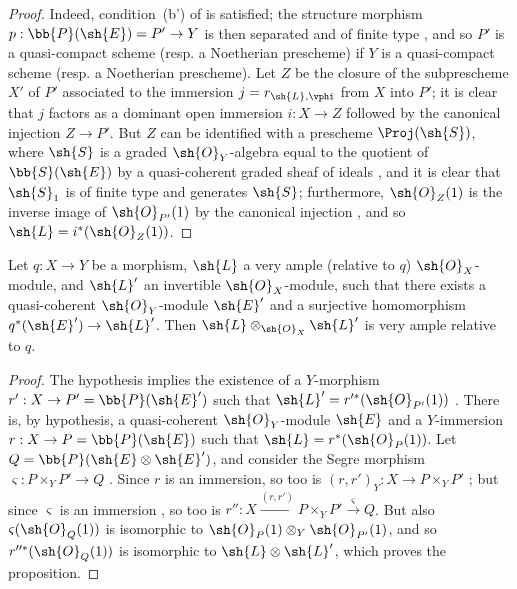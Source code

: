 \begin{proof}
Indeed, condition~(b') of  is satisfied;
the structure morphism $p:\bb{P}(\sh{E})=P'\to Y$ is then separated and of finite type , and so $P'$ is a quasi-compact scheme (resp. a Noetherian prescheme) if $Y$ is a quasi-compact scheme (resp. a Noetherian prescheme).
Let $Z$ be the closure  of the subprescheme $X'$ of $P'$ associated to the immersion $j=r_{\sh{L},\vphi}$ from $X$ into $P'$;
it is clear that $j$ factors as a dominant open immersion $i:X\to Z$ followed by the canonical injection $Z\to P'$.
But $Z$ can be identified with a prescheme $\Proj(\sh{S})$, where $\sh{S}$ is a graded $\sh{O}_Y$-algebra equal to the quotient of $\bb{S}(\sh{E})$ by a quasi-coherent graded sheaf of ideals , and it is clear that $\sh{S}_1$ is of finite type and generates $\sh{S}$;
furthermore, $\sh{O}_Z(1)$ is the inverse image of $\sh{O}_{P'}(1)$ by the canonical injection , and so $\sh{L}=i^*(\sh{O}_Z(1))$.
\end{proof}

\begin{proposition}[4.4.8]
\label{II.4.4.8}
Let $q:X\to Y$ be a morphism, $\sh{L}$ a very ample (relative to $q$) $\sh{O}_X$-module, and $\sh{L}'$ an invertible $\sh{O}_X$-module, such that there exists a quasi-coherent $\sh{O}_Y$-module $\sh{E}'$ and a surjective homomorphism $q^*(\sh{E}')\to\sh{L}'$.
Then $\sh{L}\otimes_{\sh{O}_X}\sh{L}'$ is very ample relative to $q$.
\end{proposition}

\begin{proof}
The hypothesis implies the existence of a $Y$-morphism $r':X\to P'=\bb{P}(\sh{E}')$ such that $\sh{L}'=r'^*(\sh{O}_{P'}(1))$ .
There is, by hypothesis, a quasi-coherent $\sh{O}_Y$-module $\sh{E}$ and a
$Y$-immersion $r:X\to P=\bb{P}(\sh{E})$ such that $\sh{L}=r^*(\sh{O}_P(1))$.
Let $Q=\bb{P}(\sh{E}\otimes\sh{E}')$, and consider the Segre morphism $\varsigma:P\times_Y P'\to Q$ .
Since $r$ is an immersion, so too is $(r,r')_Y:X\to P\times_Y P'$ ;
but since $\varsigma$ is an immersion , so too is $r'':X\xrightarrow{(r,r')}P\times_Y P'\xrightarrow{\varsigma}Q$.
But also  $\varsigma(\sh{O}_Q(1))$ is isomorphic to $\sh{O}_P(1)\otimes_Y\sh{O}_{P'}(1)$, and so  $r''^*(\sh{O}_Q(1))$ is isomorphic to $\sh{L}\otimes\sh{L}'$, which proves the proposition.
\end{proof}


